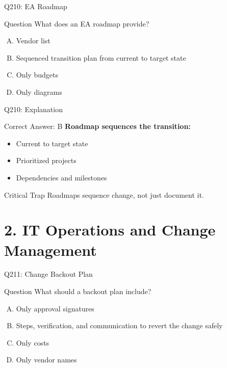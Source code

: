 \documentclass{beamer}
\begin{document}
	\begin{frame}{Q210: EA Roadmap}
		\begin{block}{Question}
			What does an EA roadmap provide?
		\end{block}
		\begin{enumerate}[(A)]
			\item Vendor list
			\item Sequenced transition plan from current to target state
			\item Only budgets
			\item Only diagrams
		\end{enumerate}
	\end{frame}
	
	\begin{frame}{Q210: Explanation}
		\begin{block}{Correct Answer: B}
			\textbf{Roadmap sequences the transition:}
			\begin{itemize}
				\item Current to target state
				\item Prioritized projects
				\item Dependencies and milestones
			\end{itemize}
		\end{block}
		\begin{alertblock}{Critical Trap}
			Roadmaps sequence change, not just document it.
		\end{alertblock}
	\end{frame}
	
	\section{2. IT Operations and Change Management}
	
	\begin{frame}{Q211: Change Backout Plan}
		\begin{block}{Question}
			What should a backout plan include?
		\end{block}
		\begin{enumerate}[(A)]
			\item Only approval signatures
			\item Steps, verification, and communication to revert the change safely
			\item Only costs
			\item Only vendor names
		\end{enumerate}
	\end{frame}
	
\end{document}
